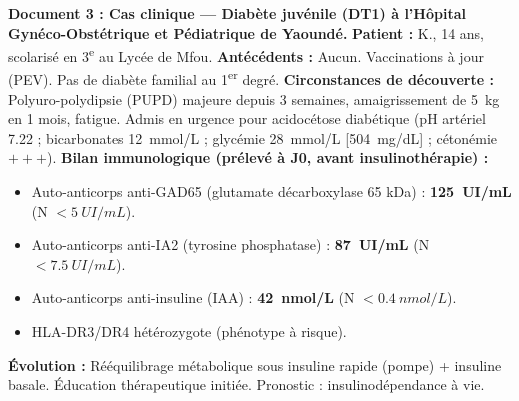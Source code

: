 \documentclass[11pt]{article}
\begin{document}
\vspace{0.5em}
\noindent\textbf{Document 3 : Cas clinique — Diabète juvénile (DT1) à l'Hôpital Gynéco-Obstétrique et Pédiatrique de Yaoundé.}
\textbf{Patient :} K., 14 ans, scolarisé en 3\textsuperscript{e} au Lycée de Mfou.
\textbf{Antécédents :} Aucun. Vaccinations à jour (PEV). Pas de diabète familial au 1\textsuperscript{er} degré.
\textbf{Circonstances de découverte :} Polyuro-polydipsie (PUPD) majeure depuis 3 semaines, amaigrissement de \SI{5}{kg} en 1 mois, fatigue. Admis en urgence pour acidocétose diabétique (pH artériel \num{7,22} ; bicarbonates \SI{12}{mmol/L} ; glycémie \SI{28}{mmol/L} [\SI{504}{mg/dL}] ; cétonémie $+++$).
\textbf{Bilan immunologique (prélevé à J0, avant insulinothérapie) :}
\begin{itemize}
    \item Auto-anticorps anti-GAD65 (glutamate décarboxylase 65 kDa) : \textbf{\SI{125}{UI/mL}} (N $< \SI{5}{UI/mL}$).
    \item Auto-anticorps anti-IA2 (tyrosine phosphatase) : \textbf{\SI{87}{UI/mL}} (N $< \SI{7,5}{UI/mL}$).
    \item Auto-anticorps anti-insuline (IAA) : \textbf{\SI{42}{nmol/L}} (N $< \SI{0,4}{nmol/L}$).
    \item HLA-DR3/DR4 hétérozygote (phénotype à risque).
\end{itemize}
\textbf{Évolution :} Rééquilibrage métabolique sous insuline rapide (pompe) + insuline basale. Éducation thérapeutique initiée. Pronostic : insulinodépendance à vie.
\end{document}

